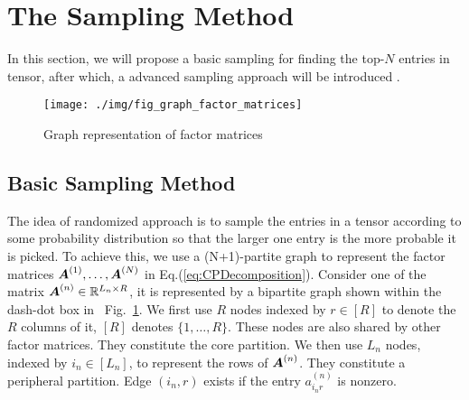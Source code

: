 \documentclass[10pt,journal,compsoc]{IEEEtran}
\newcommand{\Sca}[3]{{#1}^{(#2)}_{i_#2#3}}%
\newcommand{\anr}[2]{\Sca{a}{#1}{#2}}
\newcommand{\M}[1]{{\boldsymbol{{\MakeUppercase{#1}}}}}
\newcommand{\FacMat}[2]{\M{#1}^{(#2)}}
\newcommand{\Eqn}[1]{Eq.(\ref{eq:#1})}
\newcommand{\Fig}[1]{Fig.~\ref{fig:#1}}
\begin{document}




\section{The Sampling Method}
In this section, we will propose a basic sampling for finding the top-$N$ entries in tensor, after which, a advanced sampling approach will be introduced .

\begin{figure}[!ht]
	\centering
	\texttt{[image: ./img/fig\_graph\_factor\_matrices]}\\
	\caption{Graph representation of factor matrices}
	\label{fig:GraphMatrices}
\end{figure}

\subsection{Basic Sampling Method}

The idea of randomized approach is to sample the entries in a tensor according to some probability distribution so that the larger one entry is the more probable it is picked. To achieve this, we use a (N+1)-partite graph to represent the factor matrices $\FacMat{A}{1},\ldots,\FacMat{A}{N}$ in \Eqn{CPDecomposition}. Consider one of the matrix $\FacMat{A}{n}\in \mathbb{R}^{L_n \times R}$, it is represented by a bipartite graph shown within the dash-dot box in ~\Fig{GraphMatrices}.
We first use $R$ nodes indexed by $r\in[R]$ to denote the $R$ columns of it, $[R]$ denotes $\{1,\ldots,R\}$. These nodes are also shared by other factor matrices. They constitute the core partition. We then use $L_n$ nodes, indexed by $i_n\in [L_n]$, to represent the rows of $\FacMat{A}{n}$. They constitute a peripheral partition. Edge $(i_n,r)$ exists if the entry $\anr{n}{r}$ is nonzero.
\end{document}
